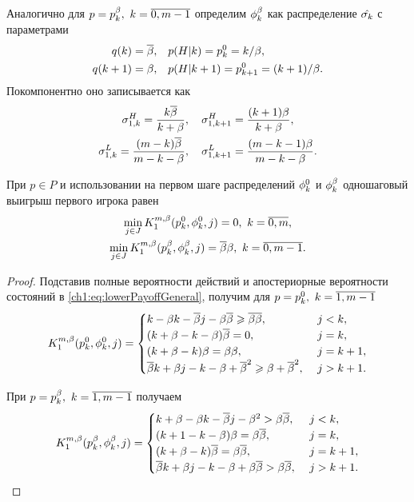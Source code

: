 {Аналогично для $p = \pOdd,\ k = \overline{0, m-1}$ определим $\fOdd$ как распределение $\sigmak$ с параметрами
\begin{align*}
  \qc{k} = \DCo,& \quad \pac{H}{k} = \pEven[k] = k/\Co,\\
  \qc{k+1} = \Co,& \quad \pac{H}{k+1} = \pEven[k+1] = (k+1)/\Co.
\end{align*}
Покомпонентно оно записывается как
\begin{gather*}
  \sigmasc[H]{k} = \frac{k\DCo}{k + \Co},\quad 
  \sigmasc[H]{k+1} = \frac{(k+1)\Co}{k + \Co},\\
  \sigmasc[L]{k} = \frac{(m - k)\DCo}{m - k - \Co},\quad 
  \sigmasc[L]{k+1} = \frac{(m - k - 1)\Co}{m - k - \Co}.
\end{gather*}

\begin{proposition}
  \label{ch1:prop:K1-base}
  При $p \in P$ и использовании на первом шаге распределений $\fEven$ и $\fOdd$ одношаговый выигрыш первого игрока равен
  \begin{equation}
    \label{ch1:eq:lowerBound:inequalities}
    \begin{gathered}
      \min_{j \in J}
      \K*{1}(\pEven, \fEven, j) = 0,\ k = \overline{0, m}, \\
      \min_{j \in J}
      \K*{1}(\pOdd, \fOdd, j) = \DCo\Co,\ k = \overline{0, m-1}.
    \end{gathered}
  \end{equation}
\end{proposition}
\begin{proof}
  Подставив полные вероятности действий и апостериорные вероятности состояний в \eqref{ch1:eq:lowerPayoffGeneral}, получим для $p = \pEven,\ k = \overline{1, m-1}$
  \begin{equation*}
    \K*{1}(\pEven, \fEven, j) = \begin{cases}
      k - \Co k - \DCo j - \Co \DCo \geq \DCo \DCo,\ & j < k,\\
      (k + \Co - k - \Co) \DCo = 0,\ & j = k,\\
      (k + \Co - k) \Co = \Co \Co,\ & j = k+1,\\
      \DCo k + \Co j - k - \Co + \DCo^2 \geq \Co + \DCo^2,\ & j > k+1.
    \end{cases}
  \end{equation*}

  При $p = \pOdd[k],\ k = \overline{1,m-1}$ получаем
  \begin{equation*}
    \K*{1}(\pOdd, \fOdd, j) = \begin{cases}
      k + \Co - \Co k - \DCo j - \Co^2 > \Co \DCo,\ & j < k,\\
      (k + 1 - k - \Co) \Co = \Co \DCo,\ & j = k,\\
      (k + \Co - k) \DCo = \Co \DCo,\ & j = k+1,\\
      \DCo k + \Co j - k - \Co + \Co \DCo > \Co \DCo,\ & j > k+1.
    \end{cases}
  \end{equation*}
  


\end{proof}}
